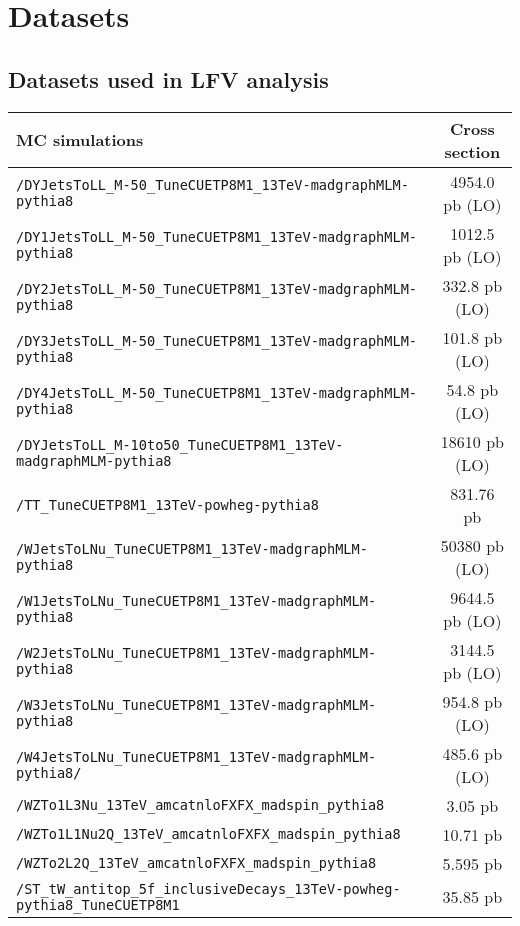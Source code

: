 
\chapter{Datasets}
\section{Datasets used in LFV analysis}



\begin{table}[!hbpt]
\begin{center}
{\footnotesize
\begin{tabular}{|l|c|}
\hline
MC simulations & Cross section \\
\hline
\texttt{/DYJetsToLL\_M-50\_TuneCUETP8M1\_13TeV-madgraphMLM-pythia8} & 4954.0 pb (LO)\\
\texttt{/DY1JetsToLL\_M-50\_TuneCUETP8M1\_13TeV-madgraphMLM-pythia8} & 1012.5 pb (LO)\\
\texttt{/DY2JetsToLL\_M-50\_TuneCUETP8M1\_13TeV-madgraphMLM-pythia8} & 332.8 pb (LO)\\
\texttt{/DY3JetsToLL\_M-50\_TuneCUETP8M1\_13TeV-madgraphMLM-pythia8} & 101.8 pb (LO)\\
\texttt{/DY4JetsToLL\_M-50\_TuneCUETP8M1\_13TeV-madgraphMLM-pythia8} & 54.8 pb (LO)\\
\texttt{/DYJetsToLL\_M-10to50\_TuneCUETP8M1\_13TeV-madgraphMLM-pythia8} & 18610 pb (LO)\\
\texttt{/TT\_TuneCUETP8M1\_13TeV-powheg-pythia8} & 831.76 pb\\
\texttt{/WJetsToLNu\_TuneCUETP8M1\_13TeV-madgraphMLM-pythia8} & 50380 pb (LO)\\
\texttt{/W1JetsToLNu\_TuneCUETP8M1\_13TeV-madgraphMLM-pythia8} & 9644.5 pb (LO)\\
\texttt{/W2JetsToLNu\_TuneCUETP8M1\_13TeV-madgraphMLM-pythia8} & 3144.5 pb (LO)\\
\texttt{/W3JetsToLNu\_TuneCUETP8M1\_13TeV-madgraphMLM-pythia8} & 954.8 pb (LO)\\
\texttt{/W4JetsToLNu\_TuneCUETP8M1\_13TeV-madgraphMLM-pythia8/} & 485.6 pb (LO)\\
\texttt{/WZTo1L3Nu\_13TeV\_amcatnloFXFX\_madspin\_pythia8} & 3.05 pb\\
\texttt{/WZTo1L1Nu2Q\_13TeV\_amcatnloFXFX\_madspin\_pythia8} & 10.71 pb\\
\texttt{/WZTo2L2Q\_13TeV\_amcatnloFXFX\_madspin\_pythia8} & 5.595 pb\\
\texttt{/ST\_tW\_antitop\_5f\_inclusiveDecays\_13TeV-powheg-pythia8\_TuneCUETP8M1} & 35.85 pb\\

\end{tabular}}
\end{center}
\end{table}
